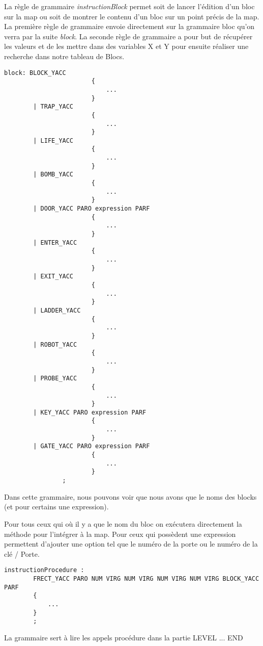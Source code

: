 La règle de grammaire \textit{instructionBlock} permet soit de lancer l'édition d'un bloc sur la map ou soit de montrer le contenu d'un bloc sur un point précis de la map.
La première règle de grammaire envoie directement sur la grammaire bloc qu'on verra par la suite  \textit{block}.
La seconde règle de grammaire a pour but de récupérer les valeurs et de les mettre dans des variables X et Y pour ensuite réaliser une recherche dans notre tableau de Blocs.

\lstset{style=mystyle}
\begin{lstlisting}[caption=Bloc]
block: BLOCK_YACC 
                        {
                            ...
                        }
        | TRAP_YACC 
                        {
                            ...
                        }
        | LIFE_YACC
                        {
                            ...
                        }
        | BOMB_YACC 
                        {
                            ...
                        }
        | DOOR_YACC PARO expression PARF
                        {   
                            ...
                        }
        | ENTER_YACC 
                        {
                            ...
                        }
        | EXIT_YACC 
                        {
                            ...
                        }
        | LADDER_YACC 
                        {
                            ...
                        }
        | ROBOT_YACC 
                        {
                            ...
                        }
        | PROBE_YACC 
                        {
                            ...
                        }
        | KEY_YACC PARO expression PARF
                        {
                            ...
                        }
        | GATE_YACC PARO expression PARF 
                        {
                            ...
                        }
                ;
\end{lstlisting}

Dans cette grammaire, nous pouvons voir que nous avons que le noms des blocks (et pour certains une expression).

Pour tous ceux qui où il y a que le nom du bloc on exécutera directement la méthode pour l'intégrer à la map.
Pour ceux qui possèdent une expression permettent d'ajouter une option tel que le numéro de la porte ou le numéro de la clé / Porte. 


\newpage

\lstset{style=mystyle}
\begin{lstlisting}[caption=Bloc]
    instructionProcedure : 
        FRECT_YACC PARO NUM VIRG NUM VIRG NUM VIRG NUM VIRG BLOCK_YACC PARF
        {
            ...
        } 
        ;    
\end{lstlisting}

La grammaire sert à lire les appels procédure dans la partie LEVEL ... END

\newpage
